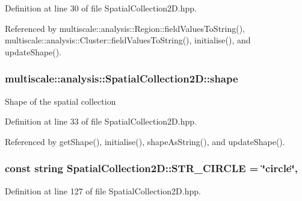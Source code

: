 Definition at line 30 of file Spatial\-Collection2\-D.\-hpp.



Referenced by multiscale\-::analysis\-::\-Region\-::field\-Values\-To\-String(), multiscale\-::analysis\-::\-Cluster\-::field\-Values\-To\-String(), initialise(), and update\-Shape().

\hypertarget{classmultiscale_1_1analysis_1_1SpatialCollection2D_a4df95ecca90ce33332a69e0aefcf73d9}{
\subsubsection[{shape}]{ multiscale\-::analysis\-::\-Spatial\-Collection2\-D\-::shape\hspace{0.3cm}{\ttfamily [protected]}}}\label{classmultiscale_1_1analysis_1_1SpatialCollection2D_a4df95ecca90ce33332a69e0aefcf73d9}
Shape of the spatial collection 

Definition at line 33 of file Spatial\-Collection2\-D.\-hpp.



Referenced by get\-Shape(), initialise(), shape\-As\-String(), and update\-Shape().

\hypertarget{classmultiscale_1_1analysis_1_1SpatialCollection2D_acf997f52cf871815e519a460336e3631}{
\subsubsection[{S\-T\-R\-\_\-\-C\-I\-R\-C\-L\-E}]{\setlength{\rightskip}{0pt plus 5cm}const string Spatial\-Collection2\-D\-::\-S\-T\-R\-\_\-\-C\-I\-R\-C\-L\-E = \char`\"{}circle\char`\"{}\hspace{0.3cm}{\ttfamily [static]}, {\ttfamily [protected]}}}\label{classmultiscale_1_1analysis_1_1SpatialCollection2D_acf997f52cf871815e519a460336e3631}


Definition at line 127 of file Spatial\-Collection2\-D.\-hpp.



